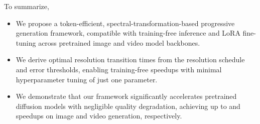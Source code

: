 


To summarize,
\begin{itemize}
    \item We propose a token-efficient, spectral-transformation-based progressive generation framework, compatible with training-free inference and LoRA fine-tuning across pretrained image and video model backbones.
    \item We derive optimal resolution transition times from the resolution schedule and error thresholds, enabling training-free speedups with minimal hyperparameter tuning of just one parameter.
    \item
    We demonstrate that our framework significantly accelerates pretrained diffusion models with negligible quality degradation, achieving up to  and  speedups on image and video generation, respectively.
\end{itemize}
\fi



